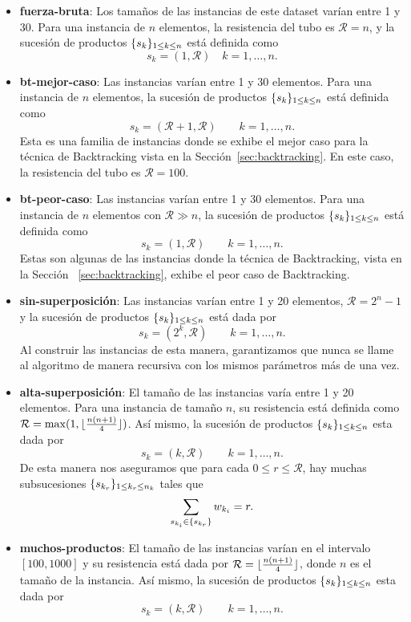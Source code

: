 \documentclass{article}
\DeclarePairedDelimiter\floor{\lfloor}{\rfloor}
\DeclarePairedDelimiter\curl{\{}{\}}
\newcommand{\sqe}[4]{\curl{#1_{#2}}_{#3 \leq #2 \leq #4}}
\newcommand{\Res}{\mathcal{R}}
\begin{document}
\begin{itemize}
    \setlength{\itemsep}{1pt}
    \setlength{\parskip}{0pt}
    \setlength{\parsep}{0pt}
    \item \textbf{fuerza-bruta}: Los tamaños de las instancias de este dataset varían entre 1 y 30. Para una instancia de $n$ elementos, la resistencia del tubo es $\Res = n$, y la sucesión de productos $\sqe{s}{k}{1}{n}$ está definida como
    \[
        s_{k} = (1, \Res) \quad k=1, \hdots, n.
    \]
    \item \textbf{bt-mejor-caso}: Las instancias varían entre 1 y 30 elementos. Para una instancia de $n$ elementos, la sucesión de productos $\sqe{s}{k}{1}{n}$ está definida como
    \[
        s_{k} = (\Res + 1, \Res) \qquad k=1, \hdots, n.
    \]
    Esta es una familia de instancias donde se exhibe el mejor caso para la técnica de Backtracking vista en la Sección~\ref{sec:backtracking}. En este caso, la resistencia del tubo es $\Res = 100$. 
    \item \textbf{bt-peor-caso}: Las instancias varían entre 1 y 30 elementos. Para una instancia de $n$ elementos con $\Res \gg n$, la sucesión de productos $\sqe{s}{k}{1}{n}$ está definida como
    \[
        s_{k} = (1, \Res) \qquad k=1, \hdots, n.
    \]
    Estas son algunas de las instancias donde la técnica de Backtracking, vista en la Sección ~\ref{sec:backtracking}, exhibe el peor caso de Backtracking.
    \item \textbf{sin-superposición}: Las instancias varían entre 1 y 20 elementos, $\Res= 2^n-1$ y la sucesión de productos $\sqe{s}{k}{1}{n}$ está dada por 
    \[
        s_{k} = (2^k, \Res) \qquad k=1, \hdots, n.
    \]
    Al construir las instancias de esta manera, garantizamos que nunca se llame al algoritmo de manera recursiva con los mismos parámetros más de una vez.
    
    \item \textbf{alta-superposición}: El tamaño de las instancias varía entre 1 y 20 elementos. Para una instancia de tamaño $n$, su resistencia está definida como $\Res = \max(1, \floor{\frac{n(n+1)}{4}})$. Así mismo, la sucesión de productos $\sqe{s}{k}{1}{n}$ esta dada por
    \[
        s_{k} = (k, \Res) \qquad k=1, \hdots, n.
    \]
    De esta manera nos aseguramos que para cada $0 \leq r \leq \Res$, hay muchas subsucesiones $\sqe{s}{k_{r}}{1}{n_{k}}$ tales que
    \[
        \sum_{s_{k_{i}}\in \curl{s_{k_{r}}}}{w_{k_{i}}} = r.
    \]
    \item \textbf{muchos-productos}: El tamaño de las instancias varían en el intervalo $[100, 1000]$ y su resistencia está dada por $\Res = \floor{\frac{n(n+1)}{4}}$, donde $n$ es el tamaño de la instancia. Así mismo, la sucesión de productos $\sqe{s}{k}{1}{n}$ esta dada por
    \[
        s_{k} = (k, \Res) \qquad k=1, \hdots, n.
    \]
\end{itemize}
\end{document}
